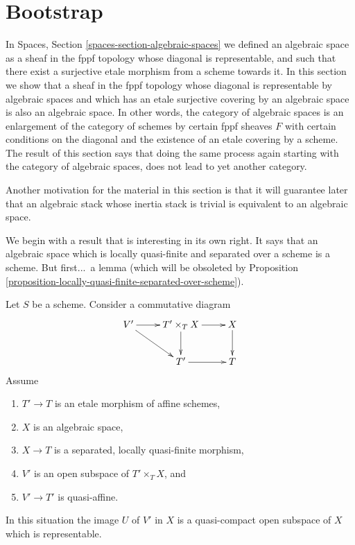\section{Bootstrap}
\label{section-bootstrap}

\noindent
In
Spaces, Section \ref{spaces-section-algebraic-spaces}
we defined an algebraic space as a sheaf in the fppf topology whose
diagonal is representable, and such that there exist a surjective etale
morphism from a scheme towards it. In this section we show that
a sheaf in the fppf topology whose diagonal is representable by algebraic
spaces and which has an etale surjective covering by an algebraic space
is also an algebraic space.
In other words, the category of algebraic spaces is an enlargement of the
category of schemes by certain fppf sheaves $F$ with certain conditions
on the diagonal and the existence of an etale covering by a scheme. The
result of this section says that doing the same process again starting with
the category of algebraic spaces, does not lead to yet another category.

\medskip\noindent
Another motivation for the material in this section is that it will guarantee
later that an algebraic stack whose inertia stack is trivial is equivalent
to an algebraic space.

\medskip\noindent
We begin with a result that is interesting in its own right.
It says that an algebraic space which is locally quasi-finite and
separated over a scheme is a scheme. But first...\ a lemma (which will
be obsoleted by
Proposition \ref{proposition-locally-quasi-finite-separated-over-scheme}).

\begin{lemma}
\label{lemma-neighbourhood-scheme}
Let $S$ be a scheme. Consider a commutative diagram
$$
\xymatrix{
V' \ar[r] \ar[rd] & T' \times_T X \ar[r] \ar[d] & X \ar[d] \\
& T' \ar[r] & T
}
$$
Assume
\begin{enumerate}
\item $T' \to T$ is an etale morphism of affine schemes,
\item $X$ is an algebraic space,
\item $X \to T$ is a separated, locally quasi-finite morphism,
\item $V'$ is an open subspace of $T' \times_T X$, and
\item $V' \to T'$ is quasi-affine.
\end{enumerate}
In this situation the image $U$ of $V'$ in $X$ is a quasi-compact
open subspace of $X$ which is representable.
\end{lemma}


